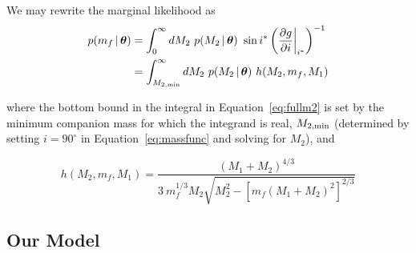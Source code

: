 \documentclass[apjl]{emulateapj}
\newcommand{\given}{\,|\,}
\newcommand{\bs}[1]{\boldsymbol{#1}}
\newcommand{\degree}{^{\circ}}
\newcommand{\eqn}{Equation~}
\newcommand{\mf}{m_f}
\begin{document}
We may rewrite the marginal likelihood as
\begin{align}
	p(\mf \given \bs{\theta}) &= \int_{0}^\infty dM_2~p(M_2 \given \bs{\theta})~\sin i^* \left(\frac{\partial g}{\partial i}\bigg\rvert_{i^*}\right)^{-1}\\
	&= \int_{M_{2,{\rm min}}}^\infty dM_2~p(M_2 \given \bs{\theta})~h(M_2, \mf, M_1) \label{eq:fullm2}
\end{align}

where the bottom bound in the integral in \eqn\ref{eq:fullm2} is set by the minimum companion mass for which the integrand is real, $M_{2,{\rm min}}$ (determined by setting $i=90\degree$ in \eqn\ref{eq:massfunc} and solving for $M_2$), and

\begin{equation}
h(M_2, \mf, M_1) = \frac{(M_1+M_2)^{4/3}}{3\ \mf^{1/3}M_2\sqrt{M_2^2 - \left[ \mf(M_1+M_2)^2 \right]^{2/3}}}
\end{equation}


\subsection{Our Model} \label{sec:experiments}
\end{document}
